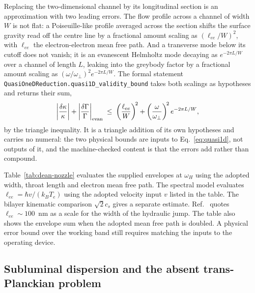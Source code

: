 \documentclass[aps,prd,reprint,nofootinbib,superscriptaddress]{revtex4-2}
\begin{document}
Replacing the two-dimensional channel by its longitudinal section is an
approximation with two leading errors. The flow profile across a channel
of width $W$ is not flat: a Poiseuille-like profile averaged across the
section shifts the surface gravity read off the centre line by a
fractional amount scaling as $(\ell_{ee}/W)^2$, with $\ell_{ee}$ the
electron-electron mean free path. And a transverse mode below its cutoff
does not vanish; it is an evanescent Helmholtz mode decaying as
$e^{-2\pi L/W}$ over a channel of length $L$, leaking into the greybody
factor by a fractional amount scaling as
$(\omega/\omega_\perp)^2 e^{-2\pi L/W}$. The formal statement
\texttt{QuasiOneDReduction.quasi1D\_validity\_bound} takes both scalings
as hypotheses and returns their sum,
\begin{equation}
\left|\frac{\delta\kappa}{\kappa}\right| +
\left|\frac{\delta\Gamma}{\Gamma}\right|_{\rm evan}
\;\leq\;
\left(\frac{\ell_{ee}}{W}\right)^{\!2} +
\left(\frac{\omega}{\omega_\perp}\right)^{\!2} e^{-2\pi L/W},
\label{eq:quasi1d}
\end{equation}
by the triangle inequality. It is a triangle addition of its own
hypotheses and carries no numeral: the two physical bounds are inputs to
Eq.~\eqref{eq:quasi1d}, not outputs of it, and the machine-checked
content is that the errors add rather than compound.

Table~\ref{tab:dean-nozzle} evaluates the supplied envelopes at
$\omega_H$ using the adopted width, throat length and electron mean free
path. The spectral model evaluates $\ell_{ee}=\hbar v/(k_BT_e)$ using
the adopted velocity input $v$ listed in the table. The bilayer kinematic
comparison $\sqrt{2}c_s$ gives a separate estimate. Ref.~\cite{Geurs2025} quotes
$\ell_{ee} \sim 100$~nm as a scale for the width of the hydraulic jump.
The table also shows the envelope sum when the adopted mean free path
is doubled. A physical error bound over the working band still requires
matching the inputs to the operating device.

\subsection{Subluminal dispersion and the absent trans-Planckian problem}
\label{sec:gr-subluminal}
\end{document}
